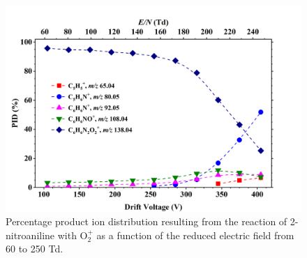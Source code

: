 
\begin{figure}%
\centering
\includegraphics[height=0.35\textheight]{pics/nitros_paper_6.png}
\caption{Percentage product ion distribution  resulting from the reaction of 2-nitroaniline with O$_2^+$ as a function of the reduced electric field from 60 to 250 Td.}
\label{fig:na_fig6}
\end{figure}


